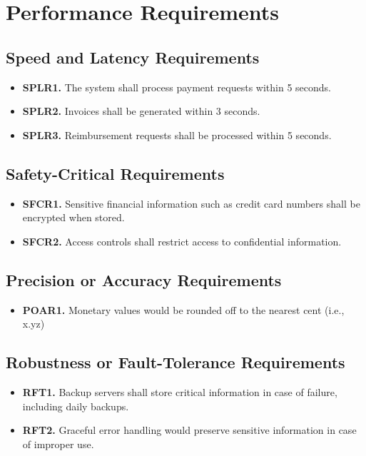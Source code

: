 \documentclass[12pt]{article}
\begin{document}
\section{Performance Requirements}
\subsection{Speed and Latency Requirements}
\begin{itemize}
    \item \textbf{SPLR1.} The system shall process payment requests within 5 seconds.
    \item \textbf{SPLR2.} Invoices shall be generated within 3 seconds.
    \item \textbf{SPLR3.} Reimbursement requests shall be processed within 5 seconds.
\end{itemize}

\subsection{Safety-Critical Requirements}
\begin{itemize}
    \item \textbf{SFCR1.} Sensitive financial information such as credit card numbers shall be encrypted when stored.
    \item \textbf{SFCR2.} Access controls shall restrict access to confidential information.
\end{itemize}

\subsection{Precision or Accuracy Requirements}
\begin{itemize}
    \item \textbf{POAR1.} Monetary values would be rounded off to the nearest cent (i.e., x.yz)
\end{itemize}

\subsection{Robustness or Fault-Tolerance Requirements}
\begin{itemize}
    \item \textbf{RFT1.} Backup servers shall store critical information in case of failure, including daily backups.
    \item \textbf{RFT2.} Graceful error handling would preserve sensitive information in case of improper use.
\end{itemize}
\end{document}
